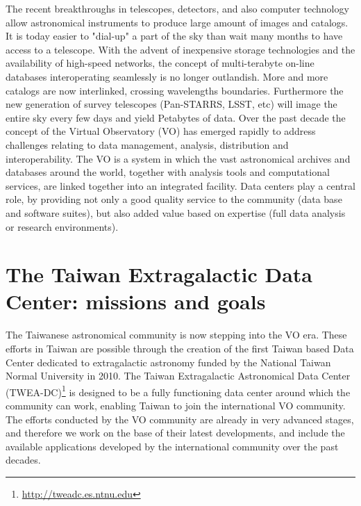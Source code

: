 \documentclass[11pt,twoside]{article}
\begin{document}
The recent breakthroughs in telescopes, detectors, and also computer technology allow astronomical instruments to produce large amount of images and catalogs. It is today easier to "dial-up" a part of the sky than wait many months to have access to a telescope. With the advent of inexpensive storage technologies and the availability of high-speed networks, the concept of multi-terabyte on-line databases interoperating seamlessly is no longer outlandish. More and more catalogs are now interlinked, crossing wavelengths boundaries. Furthermore the new generation of survey telescopes (Pan-STARRS, LSST, etc) will image the entire sky every few days and yield Petabytes of data.
Over the past decade the concept of the Virtual Observatory (VO) has emerged rapidly to address challenges relating to data management, analysis, distribution and interoperability. The VO is a system in which the vast astronomical archives and databases around the world, together with analysis tools and computational services, are linked together into an integrated facility. Data centers play a central role, by providing not only a good quality service to the community (data base and software suites), but also added value based on expertise (full data analysis or research environments).

\section{The Taiwan Extragalactic Data Center: missions and goals}

The Taiwanese astronomical community is now stepping into the VO era. These efforts in Taiwan are possible through the creation of the first Taiwan based Data Center dedicated to extragalactic astronomy funded by the National Taiwan Normal University in 2010. The Taiwan Extragalactic Astronomical Data Center (TWEA-DC)\footnote{ \url{http://tweadc.es.ntnu.edu}} is designed to be a fully functioning data center around which the community can work, enabling Taiwan to join the international VO community. The efforts conducted by the VO community are already in very advanced stages, and therefore we work on the base of their latest developments, and include the available applications developed by the international community over the past decades. \\
\end{document}
